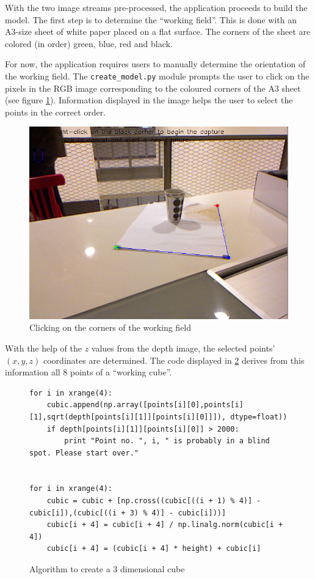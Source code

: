 With the two image streams pre-processed, the application proceeds to build the
model. The first step is to determine the ``working field''. This is done with
an A3-size sheet of white paper placed on a flat surface. The corners of the
sheet are colored (in order) green, blue, red and black.

For now, the application requires users to manually determine the orientation of
the working field. The \texttt{create\_model.py} module prompts the user to
click on the pixels in the RGB image corresponding to the coloured corners of
the A3 sheet (see figure \ref{fig:clicking}). Information displayed in the image helps the user to select the points in the correct order.

\begin{figure}[H]
\centering
\includegraphics[scale=0.5]{images/clicking.png}
\caption{Clicking on the corners of the working field}
\label{fig:clicking}
\end{figure}

With the help of the $z$ values from the depth image, the selected points'
$(x,y,z)$ coordinates are determined. The code displayed in \ref{code:cube}
derives from this information all 8 points of a ``working cube''.\\

\begin{figure}[H]
\begin{lstlisting}
for i in xrange(4):
    cubic.append(np.array([points[i][0],points[i][1],sqrt(depth[points[i][1]][points[i][0]]]), dtype=float))
    if depth[points[i][1]][points[i][0]] > 2000:
        print "Point no. ", i, " is probably in a blind spot. Please start over."


for i in xrange(4):
    cubic = cubic + [np.cross((cubic[((i + 1) % 4)] - cubic[i]),(cubic[((i + 3) % 4)] - cubic[i]))]
    cubic[i + 4] = cubic[i + 4] / np.linalg.norm(cubic[i + 4])
    cubic[i + 4] = (cubic[i + 4] * height) + cubic[i]
\end{lstlisting}
\caption{Algorithm to create a 3 dimensional cube}
\label{code:cube}
\end{figure}

